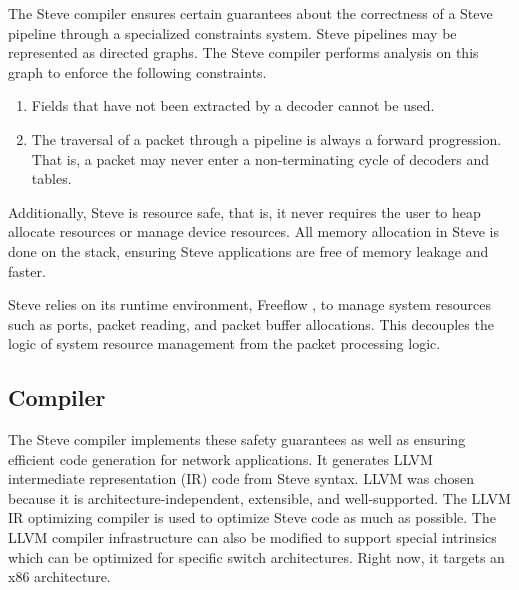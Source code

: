 The Steve compiler ensures certain guarantees about the correctness of a Steve
pipeline through a specialized constraints system. Steve pipelines may be represented as directed graphs. The
Steve compiler performs analysis on this graph to enforce the following
constraints.

\begin{enumerate}
\item Fields that have not been extracted by a decoder cannot be used.

\item The traversal of a packet through a pipeline is always a forward
progression. That is, a packet may never enter a non-terminating cycle
of decoders and tables.
\end{enumerate}

Additionally, Steve is resource safe, that is, it 
never requires the user to heap allocate resources or manage device resources. 
All memory allocation in Steve is done on the stack, ensuring Steve applications are free of
memory leakage and faster.

Steve relies on its runtime environment, Freeflow \cite{freeflow_software},
to manage system resources such as
ports, packet reading, and packet buffer allocations.
This decouples the logic of system resource management from the packet
processing logic.

\subsection{Compiler}


The Steve compiler implements these safety guarantees as well as ensuring efficient code generation for network applications.
It generates LLVM intermediate representation (IR) code
\cite{llvm_webpage} from Steve syntax. LLVM was chosen because it is architecture-independent, extensible, and well-supported.
The LLVM IR optimizing compiler is used to optimize Steve code as much as possible.
The LLVM compiler infrastructure can also be modified to support special intrinsics which can be optimized for specific switch architectures.
Right now, it targets an x86 architecture.


